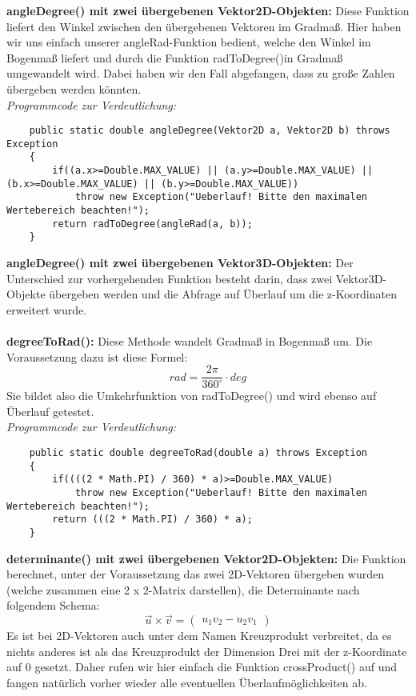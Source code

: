 \documentclass[a4paper,11pt]{scrartcl}
\begin{document}
\textbf{angleDegree() mit zwei übergebenen Vektor2D-Objekten:} Diese Funktion liefert den Winkel zwischen den übergebenen Vektoren im Gradmaß. Hier haben wir uns einfach unserer angleRad-Funktion bedient, welche den Winkel im Bogenmaß liefert und durch die Funktion radToDegree()in Gradmaß umgewandelt wird. Dabei haben wir den Fall abgefangen, dass zu große Zahlen übergeben werden könnten.\\
\textit{Programmcode zur Verdeutlichung:}
\begin{lstlisting}
	public static double angleDegree(Vektor2D a, Vektor2D b) throws Exception
	{
		if((a.x>=Double.MAX_VALUE) || (a.y>=Double.MAX_VALUE) || (b.x>=Double.MAX_VALUE) || (b.y>=Double.MAX_VALUE))
			throw new Exception("Ueberlauf! Bitte den maximalen Wertebereich beachten!");
		return radToDegree(angleRad(a, b));
	}
\end{lstlisting} $\;$ \\
\textbf{angleDegree() mit zwei übergebenen Vektor3D-Objekten:} Der Unterschied zur vorhergehenden Funktion besteht darin, dass zwei Vektor3D-Objekte übergeben werden und die Abfrage auf Überlauf um die z-Koordinaten erweitert wurde.\\
\\
\textbf{degreeToRad():} Diese Methode wandelt Gradmaß in Bogenmaß um. Die Voraussetzung dazu ist diese Formel:
\[ rad = \frac{2\pi}{360 ^\circ} \cdot deg \]
Sie bildet also die Umkehrfunktion von radToDegree() und wird ebenso auf Überlauf getestet.\\
\textit{Programmcode zur Verdeutlichung:}
\begin{lstlisting}
	public static double degreeToRad(double a) throws Exception
	{
		if((((2 * Math.PI) / 360) * a)>=Double.MAX_VALUE)
			throw new Exception("Ueberlauf! Bitte den maximalen Wertebereich beachten!");
		return (((2 * Math.PI) / 360) * a);
	}
\end{lstlisting} $\;$ \\
\textbf{determinante() mit zwei übergebenen Vektor2D-Objekten:} Die Funktion  berechnet, unter der Voraussetzung das zwei 2D-Vektoren übergeben wurden (welche zusammen eine 2 x 2-Matrix darstellen), die Determinante nach folgendem Schema:
\[ \vec u \times \vec v = \begin{pmatrix}
u_1v_2 - u_2v_1
\end{pmatrix}\]
Es ist bei 2D-Vektoren auch unter dem Namen Kreuzprodukt verbreitet, da es nichts anderes ist als das Kreuzprodukt der Dimension Drei mit der z-Koordinate auf 0 gesetzt. Daher rufen wir hier einfach die Funktion crossProduct() auf und fangen natürlich vorher wieder alle eventuellen Überlaufmöglichkeiten ab.\\
\end{document}
